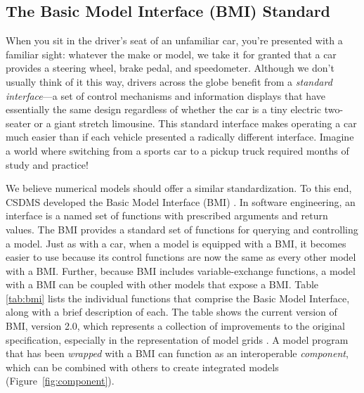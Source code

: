 \documentclass[12pt]{amsart}
\begin{document}
\subsection{The Basic Model Interface (BMI) Standard}
\label{sec:bmi}




When you sit in the driver's seat of an unfamiliar car,
you're presented with a familiar sight:
whatever the make or model,
we take it for granted that a car provides
a steering wheel, brake pedal, and speedometer.
Although we don't usually think of it this way,
drivers across the globe benefit
from a \textit{standard interface}---a set of control mechanisms and information displays
that have %
essentially the same design
regardless of whether the car
is a tiny electric two-seater or a giant stretch limousine.
This standard interface makes operating a car much easier
than if each vehicle presented a radically different interface.
Imagine a world where switching from a sports car to a pickup truck
required months of study and practice!

We believe %
numerical models should offer a similar standardization.
To this end, CSDMS
developed the Basic Model Interface (BMI) \citep{peckham2013component,hutton2020basic}.
In software engineering,
an interface is a named set of functions
with prescribed arguments and return values.
The BMI provides a standard set of functions
for querying and controlling a model.
Just as with a car,
when a model is equipped with a BMI,
it becomes easier to use
because its control functions are now the same as every other model with a BMI.
Further, because BMI includes variable-exchange functions,
a model with a BMI can be coupled with other models that expose a BMI.
Table \ref{tab:bmi} lists the individual functions
that comprise the Basic Model Interface,
along with a brief description of each.
The table shows the current version of BMI, version 2.0,
which represents a collection of improvements to the original specification,
especially in the representation of model grids \citep{hutton2020basic}. A model program that has been \textit{wrapped} with a BMI can function as an interoperable \textit{component}, which can be combined with others to create integrated models (Figure~\ref{fig:component}).
\end{document}
